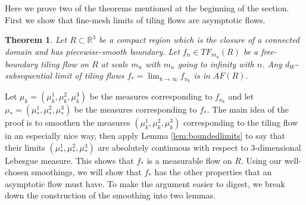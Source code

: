 \documentclass[11pt]{article}
\newtheorem{thm}{Theorem}[subsection]
\theoremstyle{remark}
\theoremstyle{definition}
\newcommand{\m}[1]{\mathbb{#1}}
\begin{document}
Here we prove two of the theorems mentioned at the beginning of the section. First we show that fine-mesh limits of tiling flows are asymptotic flows. 

\begin{thm}\label{thm:formal_fine_mesh}
Let $R\subset \m R^3$ be a compact region which is the closure of a connected domain and has piecewise-smooth boundary. Let $f_n\in TF_{m_n}(R)$ be a free-boundary tiling flow on $R$ at scale $m_n$ with $m_n$ going to infinity with $n$. Any $d_W$-subsequential limit of tiling flows $f_* = \lim_{k\to \infty} f_{{n_k}}$ is in $AF(R)$. 
\end{thm}

Let $\mu_k = (\mu_k^1,\mu_k^2, \mu_k^3)$ be the measures corresponding to $f_{{n_k}}$ and let $\mu_* = (\mu_*^1,\mu_*^2,\mu_*^3)$ be the measures corresponding to $f_*$. The main idea of the proof is to smoothen the measures $(\mu_k^1,\mu_k^2, \mu_k^3)$ corresponding to the tiling flow in an especially nice way, then apply Lemma \ref{lem:boundedlimits} to say that their limits $(\mu_*^1,\mu_*^2,\mu_*^3)$ are absolutely continuous with respect to 3-dimensional Lebesgue measure. This shows that $f_*$ is a measurable flow on $R$. Using our well-chosen smoothings, we will show that $f_*$ has the other properties that an asymptotic flow must have. To make the argument easier to digest, we break down the construction of the smoothing into two lemmas. 
\end{document}
